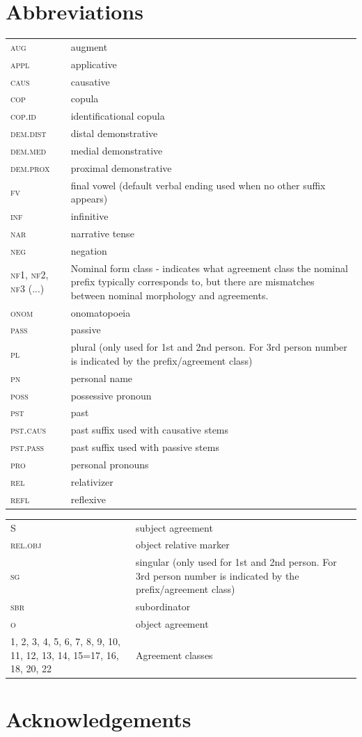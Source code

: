 \documentclass[output=paper,colorlinks,citecolor=brown,draftmode]{langscibook}
\begin{document}
\section*{Abbreviations}
 \begin{tabularx}{\textwidth}{lQ}
\textsc{aug} & augment \\
 \textsc{appl} & applicative \\
 \textsc{caus} & causative  \\
 \textsc{cop} & copula  \\
 \textsc{cop.id} & identificational copula  \\
 \textsc{dem.dist} & distal demonstrative \\
 \textsc{dem.med} & medial demonstrative \\
 \textsc{dem.prox} & proximal demonstrative \\
 \textsc{fv} & final vowel (default verbal ending used when no other suffix appears) \\
 \textsc{inf} & infinitive  \\
 \textsc{nar} & narrative tense \\
  \textsc{neg} & negation  \\
  \textsc{nf1, nf2, nf3} (...) & Nominal form class - indicates what agreement class the nominal prefix typically corresponds to, but there are mismatches between nominal morphology and agreements.  \\
  \textsc{onom} & onomatopoeia \\
  \textsc{pass} & passive \\
 \textsc{pl} & plural (only used for 1st and 2nd person. For 3rd person number is indicated by the prefix/agreement class) \\
 \textsc{pn} & personal name \\
 \textsc{poss} & possessive pronoun  \\
 \textsc{pst} & past \\
 \textsc{pst.caus} & past suffix used with causative stems \\
 \textsc{pst.pass} & past suffix used with passive stems \\
 \textsc{pro} & personal pronouns \\
 \textsc{rel} & relativizer \\
 \textsc{refl} & reflexive \\
 \end{tabularx}
 \begin{tabularx}{\textwidth}{p{3cm}Q}
 S & subject agreement \\
 \textsc{rel.obj} & object relative marker \\
 \textsc{sg} & singular (only used for 1st and 2nd person. For 3rd person number is indicated by the prefix/agreement class) \\
 \textsc{sbr} & subordinator \\
 \textsc{o} & object agreement \\
 1, 2, 3, 4, 5, 6, 7, 8, 9, 10, 11, 12, 13, 14, 15=17, 16, 18, 20, 22   &  Agreement classes
\end{tabularx}


\section*{Acknowledgements}


\sloppy %

\printbibliography[heading=subbibliography,notkeyword=this]
\end{document}
